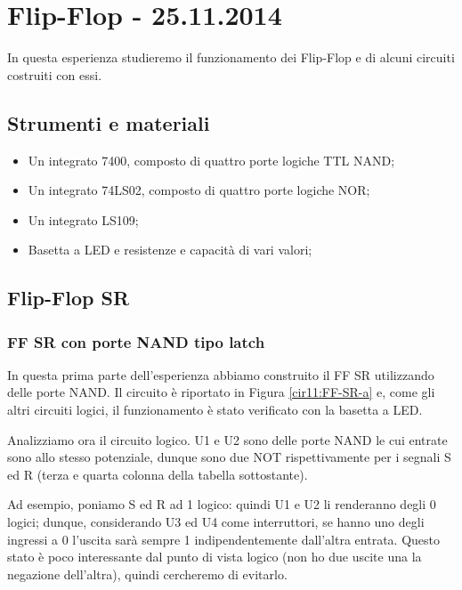 \section{Flip-Flop - 25.11.2014}

In questa esperienza studieremo il funzionamento dei Flip-Flop e di alcuni circuiti costruiti con essi.

\subsection*{Strumenti e materiali}

\begin{itemize} [noitemsep]
	\item Un integrato 7400, composto di quattro porte logiche TTL NAND; %
	\item Un integrato 74LS02, composto di quattro porte logiche NOR;
	\item Un integrato LS109;
	\item Basetta a LED e resistenze e capacità di vari valori;
\end{itemize}

\subsection{Flip-Flop SR}

\subsubsection*{FF SR con porte NAND tipo latch}


In questa prima parte dell'esperienza abbiamo construito il FF SR utilizzando delle porte NAND.
Il circuito è riportato in Figura \ref{cir11:FF-SR-a} e, come gli altri circuiti logici, il funzionamento è stato verificato con la basetta a LED.

Analizziamo ora il circuito logico.
U1 e U2 sono delle porte NAND le cui entrate sono allo stesso potenziale, dunque sono due NOT rispettivamente per i segnali S ed R (terza e quarta colonna della tabella sottostante).

Ad esempio, poniamo S ed R ad 1 logico: quindi U1 e U2 li renderanno degli 0 logici; dunque, considerando U3 ed U4 come interruttori, se hanno uno degli ingressi a 0 l'uscita sarà sempre 1 indipendentemente dall'altra entrata.
Questo stato è poco interessante dal punto di vista logico (non ho due uscite una la negazione dell'altra), quindi cercheremo di evitarlo.


